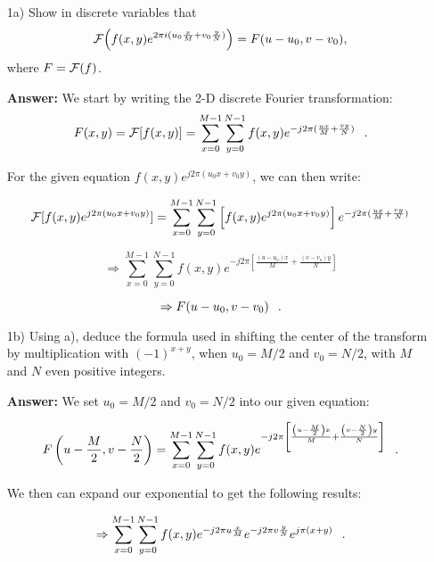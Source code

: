 \documentclass{article}
\begin{document}
\begin{enumerate}
\item[1a)]  Show in discrete variables that 
$${\cal F}\Big(f(x,y)e^{2\pi i(u_0\frac{x}{M}+v_0\frac{y}{N})}\Big)=F(u-u_0,v-v_0),$$ where $F={\cal F}(f)$.

\textbf{Answer:} We start by writing the 2-D discrete Fourier transformation:
$$F(x,y) = {\cal F}[f(x,y)] = \sum_{x=0}^{M-1} \sum_{y=0}^{N-1} f(x,y) e^{-j2 \pi (\frac{ux}{M} + \frac{vy}{N})} \hspace{0.1in} .$$ 

For the given equation $f(x,y) e^{j2\pi (u_{0} x + v_{0} y)}$, we can then write:

\begin{equation}
{\cal F}[f(x,y) e^{j2\pi (u_{0} x + v_{0} y)}] =  \sum_{x=0}^{M-1} \sum_{y=0}^{N-1} \left[ f(x,y) e^{j2\pi (u_{0} x + v_{0} y)} \right] e^{-j2\pi (\frac{ux}{M} + \frac{vy}{N})}
\end{equation}

\begin{equation}
\Rightarrow \sum_{x=0}^{M-1} \sum_{y=0}^{N-1} f(x,y) e^{-j2\pi [\frac{(u - u_{o})x}{M} + \frac{(v-v_{o})y}{N}]}
\end{equation}

\begin{equation}
\Rightarrow F(u - u_0 , v - v_0) \hspace{0.1in} .
\end{equation}

\item[1b)] Using a), deduce the formula used in shifting the center of the transform by multiplication with $(-1)^{x+y}$, when 
$u_0=M/2$ and $v_0=N/2$, with $M$ and $N$ even positive integers.

\textbf{Answer: } We set $u_0 = M/2$ and $v_0 = N/2$ into our given equation:

\begin{equation}
F\left(u - \frac{M}{2}, v - \frac{N}{2}\right) = \sum_{x=0}^{M-1} \sum_{y=0}^{N-1} f(x,y) e^{-j2\pi \left[\frac{\left(u - \frac{M}{2}\right)x}{M} + \frac{\left(v-\frac{N}{2}\right)y}{N}\right]} \hspace{0.1in} .
\end{equation}

We then can expand our exponential to get the following results:

\begin{equation}
\Rightarrow \sum_{x=0}^{M-1} \sum_{y=0}^{N-1} f(x,y) e^{-j2\pi u \frac{x}{M}} e^{-j2\pi v \frac{y}{N}} e^{j\pi(x + y)} \hspace{0.1in} .
\end{equation}


\end{enumerate}
\end{document}
